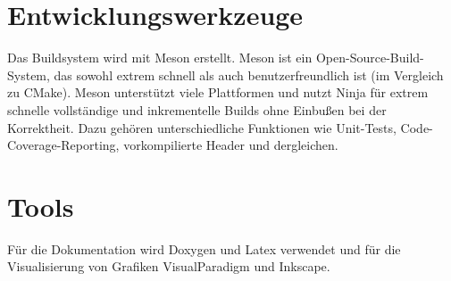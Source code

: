 \documentclass[../review_1.tex]{subfiles}
\begin{document}
\section{Entwicklungswerkzeuge}
Das Buildsystem wird mit Meson erstellt. Meson ist ein Open-Source-Build-System, das sowohl extrem schnell als auch benutzerfreundlich ist (im Vergleich zu CMake). Meson unterstützt viele Plattformen und nutzt Ninja für extrem schnelle vollständige und inkrementelle Builds ohne Einbußen bei der Korrektheit. Dazu gehören unterschiedliche Funktionen wie Unit-Tests, Code-Coverage-Reporting, vorkompilierte Header und dergleichen.

\section{Tools}
Für die Dokumentation wird Doxygen und Latex verwendet und für die Visualisierung von Grafiken VisualParadigm und Inkscape.
\end{document}
